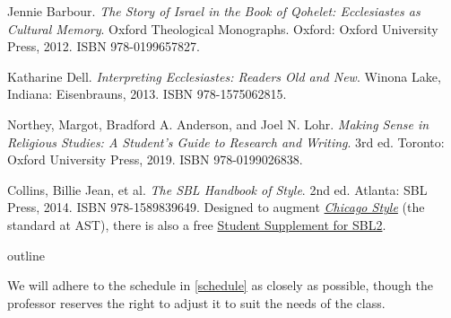 \documentclass[titlepage]{article}
\begin{document}
\begingroup
\renewcommand{\section}[2]{}%
\begin{thebibliography}{Making Sense}%

	 Jennie Barbour.
	\emph{The Story of Israel in the Book of Qohelet: Ecclesiastes as Cultural Memory}. Oxford Theological Monographs.
	Oxford: Oxford University Press, 2012.
	ISBN 978-0199657827.

	 Katharine Dell.
	\emph{Interpreting Ecclesiastes: Readers Old and New}.
	Winona Lake, Indiana: Eisenbrauns, 2013.
	ISBN 978-1575062815.

	 Northey, Margot, Bradford A. Anderson, and Joel N. Lohr.
	\emph{Making Sense in Religious Studies: A Student's Guide to Research and Writing}.
	3rd ed. Toronto: Oxford University Press, 2019. ISBN 978-0199026838.

	 Collins, Billie Jean, et al.
	\emph{The SBL Handbook of Style}.
	2nd ed. Atlanta: SBL Press, 2014. ISBN 978-1589839649.
	Designed to augment \href{http://www.chicagomanualofstyle.org/home.html}{\emph{Chicago Style}}
	(the standard at AST), there is also a free
	\href{https://www.sbl-site.org/assets/pdfs/pubs/SBLHSsupp2015-02.pdf}{Student Supplement for SBL2}.

\end{thebibliography}
\endgroup

\section{Course Outline}
\label{outline}

We will adhere to the schedule in \autoref{schedule} as closely as
possible, though the professor reserves the right to adjust it to suit
the needs of the class.
\end{document}
